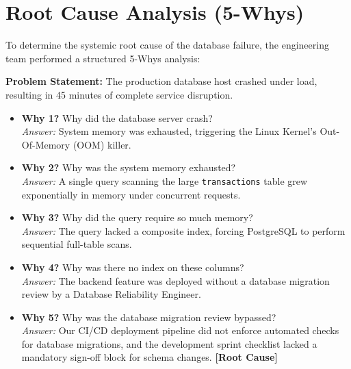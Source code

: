 \section{Root Cause Analysis (5-Whys)}
To determine the systemic root cause of the database failure, the engineering team performed a structured 5-Whys analysis:

\begin{tcolorbox}[colback=LightNeutral, colframe=PrimaryColor, arc=4pt, title=\textbf{5-Whys Analysis}, fonttitle=\large\bfseries, boxrule=1.5pt]
  \textbf{Problem Statement:} The production database host crashed under load, resulting in 45 minutes of complete service disruption.
  
  \vspace{0.2cm}
  \begin{itemize}[label=\textcolor{AccentColor}{\small\faArrowRight}, leftmargin=15pt, itemsep=4pt]
    \item \textbf{Why 1? } Why did the database server crash? \\
      \textit{Answer: } System memory was exhausted, triggering the Linux Kernel's Out-Of-Memory (OOM) killer.
    \item \textbf{Why 2? } Why was the system memory exhausted? \\
      \textit{Answer: } A single query scanning the large \texttt{transactions} table grew exponentially in memory under concurrent requests.
    \item \textbf{Why 3? } Why did the query require so much memory? \\
      \textit{Answer: } The query lacked a composite index, forcing PostgreSQL to perform sequential full-table scans.
    \item \textbf{Why 4? } Why was there no index on these columns? \\
      \textit{Answer: } The backend feature was deployed without a database migration review by a Database Reliability Engineer.
    \item \textbf{Why 5? } Why was the database migration review bypassed? \\
      \textit{Answer: } Our CI/CD deployment pipeline did not enforce automated checks for database migrations, and the development sprint checklist lacked a mandatory sign-off block for schema changes. \textbf{[Root Cause]}
  \end{itemize}
\end{tcolorbox}

\vspace{0.4cm}

